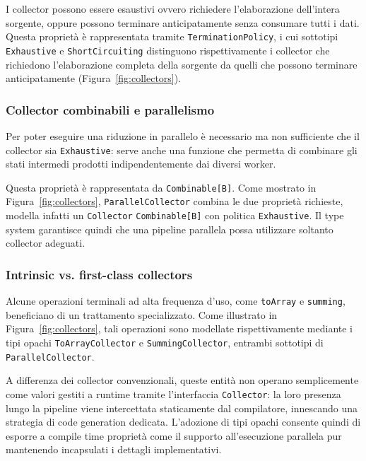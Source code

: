 \documentclass[a4paper,11pt]{report}
\theoremstyle{definition}
\begin{document}
I collector possono essere esaustivi ovvero richiedere l'elaborazione dell'intera sorgente, oppure possono terminare anticipatamente senza consumare tutti i dati. Questa proprietà è rappresentata tramite \texttt{TerminationPolicy}, i cui sottotipi \texttt{Exhaustive} e \texttt{ShortCircuiting} distinguono rispettivamente i collector che richiedono l'elaborazione completa della sorgente da quelli che possono terminare anticipatamente (Figura~\ref{fig:collectors}).

\subsubsection{Collector combinabili e parallelismo}

Per poter eseguire una riduzione in parallelo è necessario ma non sufficiente che il collector sia \texttt{Exhaustive}: serve anche una funzione che permetta di combinare gli stati intermedi prodotti indipendentemente dai diversi worker.

Questa proprietà è rappresentata da \texttt{Combinable[B]}. Come mostrato in Figura~\ref{fig:collectors}, \texttt{ParallelCollector} combina le due proprietà richieste, modella infatti un \texttt{Collector} \texttt{Combinable[B]} con politica \texttt{Exhaustive}. Il type system garantisce quindi che una pipeline parallela possa utilizzare soltanto collector adeguati.

\subsubsection{Intrinsic vs. first-class collectors}

Alcune operazioni terminali ad alta frequenza d'uso, come \texttt{toArray} e \texttt{summing}, beneficiano di un trattamento specializzato. Come illustrato in Figura~\ref{fig:collectors}, tali operazioni sono modellate rispettivamente mediante i tipi opachi \texttt{ToArrayCollector} e \texttt{SummingCollector}, entrambi sottotipi di \texttt{ParallelCollector}.

A differenza dei collector convenzionali, queste entità non operano semplicemente come valori gestiti a runtime tramite l'interfaccia \texttt{Collector}: la loro presenza lungo la pipeline viene intercettata staticamente dal compilatore, innescando una strategia di code generation dedicata. L'adozione di tipi opachi consente quindi di esporre a compile time proprietà come il supporto all'esecuzione parallela pur mantenendo incapsulati i dettagli implementativi.
\end{document}
